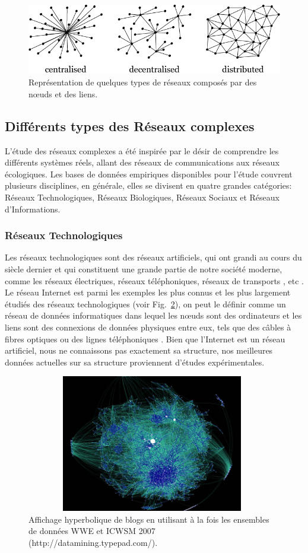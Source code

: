 \begin{figure}[h!]
	\centering
	\includegraphics[scale=0.55]{./figures/types-networks2}
	\caption{Représentation de quelques types de réseaux composés par des nœuds et des liens. }
	\label{exemples-reseaux}
\end{figure}
\subsection{Différents types des Réseaux complexes}
L'étude des réseaux complexes a été inspirée par le désir de comprendre les différents systèmes réels, allant 
des réseaux de communications aux réseaux écologiques. Les bases de données empiriques disponibles pour l'étude
couvrent plusieurs disciplines, en générale, elles se divisent en quatre grandes catégories: Réseaux Technologiques,
Réseaux Biologiques, Réseaux Sociaux et Réseaux d'Informations.
\subsubsection{Réseaux Technologiques}
Les réseaux technologiques sont des réseaux artificiels, qui ont grandi au cours du siècle dernier et qui constituent
une grande partie de notre société moderne, comme les réseaux électriques, réseaux téléphoniques, réseaux de transports
, etc \cite{Pi1965,Am-al2000,Do-al2007,Se-al2003}.
Le réseau Internet est parmi les exemples les plus connus et les plus largement étudiés des réseaux technologiques 
(voir Fig.~\ref{Internet}), on peut le définir comme un réseau de données informatiques dans lequel les nœuds 
sont des ordinateurs et les liens sont des connexions de données physiques entre eux, tels que des câbles à fibres
optiques ou des lignes téléphoniques \cite{F-al1999,BC2001}. Bien que l'Internet est un réseau 
artificiel, nous ne connaissons pas exactement sa structure, nos meilleures données actuelles sur sa structure 
proviennent d'études expérimentales.
\begin{figure}[h!]
	\centering
	\includegraphics[width=11cm,height=6cm]{./figures/Internet3}
	\caption{Affichage hyperbolique de blogs en utilisant à la fois les ensembles 
		de données WWE et ICWSM 2007 (http://datamining.typepad.com/).}
	\label{Internet}
\end{figure}

